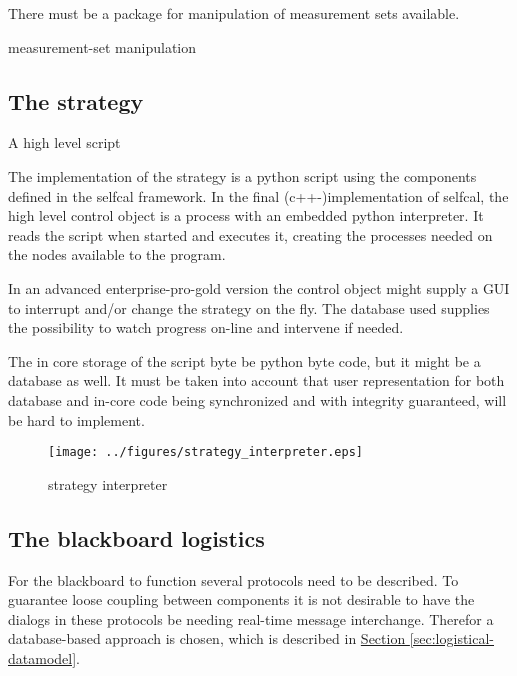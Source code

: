 \documentclass[]{lofar}
\begin{document}
      \begin{prerequisite}
        There must be a package for manipulation of measurement sets available.
        \caption{measurement-set manipulation\label{pre:aips++}}
      \end{prerequisite}

    \subsection{The strategy}{A high level script}
    \label{subsec:strategy}\hypertarget{subsec:strategy}{}

      The implementation of the strategy is a python script using the
      components defined in the selfcal framework. In the final
      (c++-)implementation of selfcal, the high level control object
      is a process with an embedded python interpreter. It reads the
      script when started and executes it, creating the processes
      needed on the nodes available to the program.

      In an advanced enterprise-pro-gold version the control object
      might supply a GUI to interrupt and/or change the strategy on
      the fly. The database used supplies the possibility to watch
      progress on-line and intervene if needed.

      The in core storage of the script byte be python byte code, but
      it might be a database as well. It must be taken into account
      that user representation for both database and in-core code
      being synchronized and with integrity guaranteed, will be hard
      to implement.

      \begin{figure}
        \texttt{[image: ../figures/strategy\_interpreter.eps]}
        \hypertarget{fig:strategy_interpreter}{}
        \caption{strategy interpreter\label{fig:strategy_interpreter}}
      \end{figure}

    \subsection{The blackboard logistics}
    \label{subsec:blackboard-logistics}\hypertarget{subsec:blackboard-logistics}{}

      For the blackboard to function several protocols need to be
      described. To guarantee loose coupling between components it is
      not desirable to have the dialogs in these protocols be needing
      real-time message interchange. Therefor a database-based
      approach is chosen, which is described in
      \hyperlink{sec:logistical-datamodel}{Section
      \ref{sec:logistical-datamodel}}.
\end{document}
